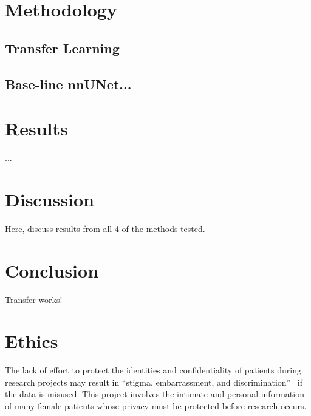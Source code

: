 \documentclass[12pt,twoside]{report}
\begin{document}
\chapter{Methodology}\label{sect:methodology}

\section{Transfer Learning}

\section{Base-line nnUNet...}

\chapter{Results}\label{sect:results}

...

\chapter{Discussion}\label{sect:discussion}

Here, discuss results from all 4 of the methods tested.



\chapter{Conclusion}

Transfer works!


\chapter{Ethics}

The lack of effort to protect the identities and confidentiality of patients during research projects may result in ``stigma, embarrassment, and discrimination''~\cite{health-privacy} if the data is misused.
This project involves the intimate and personal information of many female patients whose privacy must be protected before research occurs.
\end{document}
